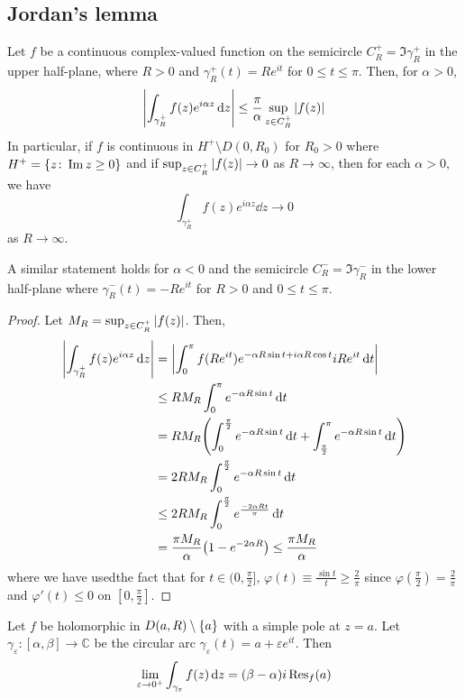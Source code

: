 \subsection{Jordan's lemma}
\begin{lemma}
	Let \( f \) be a continuous complex-valued function on the semicircle \( C_R^+ = \Im \gamma_R^+ \) in the upper half-plane, where \( R > 0 \) and \( \gamma_R^+(t) = Re^{it} \) for \( 0 \leq t \leq \pi \).
	Then, for \( \alpha > 0 \),
	\[ \abs{\int_{\gamma_R^+} f(z) e^{i\alpha z} \dd{z}} \leq \frac{\pi}{\alpha} \sup_{z \in C_R^+} \abs{f(z)} \]
	In particular, if \( f \) is continuous in \( H^+ \setminus D(0,R_0) \) for \( R_0 > 0 \) where \( H^+ = \qty{z \colon \Im z \geq 0} \) and if \( \sup_{z \in C_R^+} \abs{f(z)} \to 0 \) as \( R \to \infty \), then for each \( \alpha > 0 \), we have
	\[ \int_{\gamma_R^+} f(z) e^{i\alpha z} \dd{z} \to 0 \]
	as \( R \to \infty \).
\end{lemma}
A similar statement holds for \( \alpha < 0 \) and the semicircle \( C_R^- = \Im \gamma_R^- \) in the lower half-plane where \( \gamma_R^-(t) = -Re^{it} \) for \( R > 0 \) and \( 0 \leq t \leq \pi \).
\begin{proof}
	Let \( M_R = \sup_{z \in C_R^+} \abs{f(z)} \).
	Then,
	\begin{align*}
		\abs{\int_{\gamma_R^+} f(z) e^{i\alpha z} \dd{z}} &= \abs{\int_0^\pi f(Re^{it}) e^{-\alpha R \sin t + i\alpha R \cos t}iRe^{it} \dd{t}} \\
		&\leq RM_R \int_0^\pi e^{-\alpha R \sin t} \dd{t} \\
		&= RM_R \qty( \int_0^{\frac{\pi}{2}} e^{-\alpha R \sin t} \dd{t} + \int_{\frac{\pi}{2}}^\pi e^{-\alpha R \sin t} \dd{t} ) \\
		&= 2RM_R \int_0^{\frac{\pi}{2}} e^{-\alpha R \sin t} \dd{t} \\
		&\leq 2 RM_R \int_0^{\frac{\pi}{2}} e^{\frac{-2\alpha R t}{\pi}} \dd{t} \\
		&= \frac{\pi M_R}{\alpha} \qty(1 - e^{-2\alpha R}) \leq \frac{\pi M_R}{\alpha}
	\end{align*}
	where we have usedthe fact that for \( t \in (0,\frac{\pi}{2}] \), \( \varphi(t) \equiv \frac{\sin t}{t} \geq \frac{2}{\pi} \) since \( \varphi(\frac{\pi}{2}) = \frac{2}{\pi} \) and \( \varphi'(t) \leq 0 \) on \( [0,\frac{\pi}{2}] \).
\end{proof}
\begin{lemma}
	Let \( f \) be holomorphic in \( D(a,R) \setminus \qty{a} \) with a simple pole at \( z = a \).
	Let \( \gamma_\varepsilon \colon [\alpha,\beta] \to \mathbb C \) be the circular arc \( \gamma_\varepsilon(t) = a + \varepsilon e^{it} \).
	Then
	\[ \lim_{\varepsilon \to 0^+} \int_{\gamma_\varepsilon} f(z) \dd{z} = (\beta - \alpha) i \Res_f(a)\]
\end{lemma}
